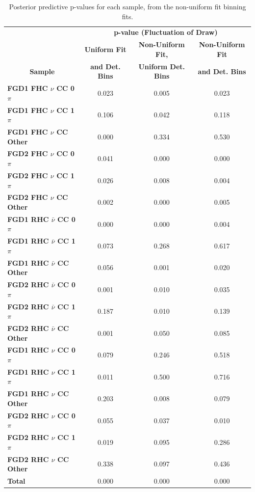 \begin{center}
\begin{table}[!htbp]
\center
\begin{tabular}{l||c c c}
\hline \hline
& \multicolumn{3}{c}{\textbf{p-value (Fluctuation of Draw)}} \\
& \multicolumn{1}{c}{\textbf{Uniform Fit}} & \multicolumn{1}{c}{\textbf{Non-Uniform Fit,}} & \multicolumn{1}{c}{\textbf{Non-Uniform Fit}}\\
\multicolumn{1}{c||}{\textbf{Sample}} & \multicolumn{1}{c}{\textbf{and Det. Bins}} & \multicolumn{1}{c}{\textbf{Uniform Det. Bins}} & \multicolumn{1}{c}{\textbf{and Det. Bins}}\\
\hline \hline
\textbf{FGD1 FHC $\nu$ CC 0$\pi$} & 0.023 & 0.005 & 0.023 \\ 
\textbf{FGD1 FHC $\nu$ CC 1$\pi$} & 0.106 & 0.042 & 0.118 \\
\textbf{FGD1 FHC $\nu$ CC Other} & 0.000 & 0.334 & 0.530 \\ \hline
\textbf{FGD2 FHC $\nu$ CC 0$\pi$} & 0.041 & 0.000 & 0.000 \\
\textbf{FGD2 FHC $\nu$ CC 1$\pi$} & 0.026 & 0.008 & 0.004\\ 
\textbf{FGD2 FHC $\nu$ CC Other} & 0.002 & 0.000 & 0.005\\ \hline
\textbf{FGD1 RHC $\bar{\nu}$ CC 0$\pi$} & 0.000 & 0.000 & 0.004\\
\textbf{FGD1 RHC $\bar{\nu}$ CC 1$\pi$} & 0.073 & 0.268 & 0.617 \\
\textbf{FGD1 RHC $\bar{\nu}$ CC Other} & 0.056 & 0.001 & 0.020 \\ \hline
\textbf{FGD2 RHC $\bar{\nu}$ CC 0$\pi$} & 0.001 & 0.010 & 0.035 \\
\textbf{FGD2 RHC $\bar{\nu}$ CC 1$\pi$} & 0.187 & 0.010 & 0.139\\
\textbf{FGD2 RHC $\bar{\nu}$ CC Other} & 0.001 & 0.050 & 0.085 \\ \hline
\textbf{FGD1 RHC $\nu$ CC 0$\pi$} & 0.079 & 0.246 & 0.518 \\
\textbf{FGD1 RHC $\nu$ CC 1$\pi$} & 0.011 & 0.500 & 0.716\\
\textbf{FGD1 RHC $\nu$ CC Other} & 0.203 & 0.008 & 0.079\\ \hline
\textbf{FGD2 RHC $\nu$ CC 0$\pi$} & 0.055 & 0.037 & 0.010\\
\textbf{FGD2 RHC $\nu$ CC 1$\pi$} & 0.019 & 0.095 & 0.286\\
\textbf{FGD2 RHC $\nu$ CC Other} & 0.338 & 0.097 & 0.436\\ \hline
\textbf{Total} & 0.000 & 0.000 & 0.000 \\ \hline\hline
\end{tabular}
\caption{Posterior predictive p-values for each sample, from the non-uniform fit binning fits.}
\label{tab:polypval}
\end{table}
\end{center}

